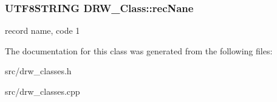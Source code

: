 \subsubsection[{rec\+Nane}]{\setlength{\rightskip}{0pt plus 5cm}U\+T\+F8\+S\+T\+R\+I\+N\+G D\+R\+W\+\_\+\+Class\+::rec\+Nane}\label{class_d_r_w___class_ac3470fefc02faf7f2eb5dff1dac7af9a}
record name, code 1 

The documentation for this class was generated from the following files\+:\begin{DoxyCompactItemize}
\item 
src/drw\+\_\+classes.\+h\item 
src/drw\+\_\+classes.\+cpp\end{DoxyCompactItemize}
